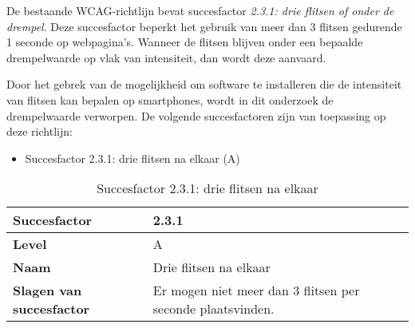 De bestaande WCAG-richtlijn bevat succesfactor \emph{2.3.1: drie flitsen of onder de drempel}. Deze succesfactor beperkt het gebruik van meer dan 3 flitsen gedurende 1 seconde op webpagina's. Wanneer de flitsen blijven onder een bepaalde drempelwaarde op vlak van intensiteit, dan wordt deze aanvaard. 

Door het gebrek van de mogelijkheid om software te installeren die de intensiteit van flitsen kan bepalen op smartphones, wordt in dit onderzoek de drempelwaarde verworpen. De volgende succesfactoren zijn van toepassing op deze richtlijn: 
\begin{itemize}
    \item Succesfactor 2.3.1: drie flitsen na elkaar (A)
\end{itemize}


\begin{table}[H]
    \centering
    \caption{Succesfactor 2.3.1: drie flitsen na elkaar}
    
    
    \hspace*{-1cm}\begin{tabular}{|l|p{12cm}|} 
        \hline
        \textbf{Succesfactor}                 & 2.3.1                                                                                                                                                                                                                                                                                                                                                                                                                                                                                                          \\ 
        \hline
        \textbf{Level}                        & A                                                                                                                                                                                                                                                                                                                                                                                                                                                                                                                 \\ 
        \hline
        \textbf{Naam}                         & Drie flitsen na elkaar~                                                                                                                                                                                                                                                                                                                                                                                                                                                                                      \\ 
        \hline
        \textbf{Slagen van succesfactor}      & Er mogen niet meer dan 3 flitsen per seconde plaatsvinden.                                                                                                                                   \\ 
      

\end{tabular}
\end{table}
